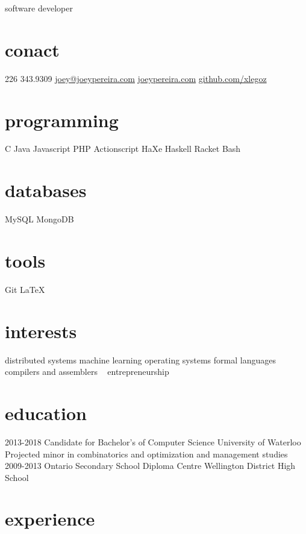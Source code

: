 \documentclass[]{friggeri-cv}
\begin{document}
       {software developer}

\begin{aside}
  \section{conact}
    226 343.9309
    \href{mailto:joey.pereira@uwaterloo.ca}{joey@joeypereira.com}
    \href{http://joeypereira.com}{joeypereira.com}
    \href{http://www.github.com/xlegoz}{github.com/xlegoz}
  \section{programming}
	C
	Java
	Javascript
	PHP
	Actionscript
	HaXe
	Haskell
	Racket
	Bash
  \section{databases}
    MySQL
    MongoDB
  \section{tools}
	Git
    \LaTeX
  \section{interests}
  	distributed systems
  	machine learning
  	operating systems
  	formal languages
  	compilers and assemblers
  	~
  	entrepreneurship   	
\end{aside}

\section{education}

\begin{entrylist}
  \entry
    {2013-2018}
    {Candidate for Bachelor's of Computer Science}
    {University of Waterloo}
	{Projected minor in combinatorics and optimization and management studies}
  \entry
  	{2009-2013}
  	{Ontario Secondary School Diploma}
  	{Centre Wellington District High School}
    {}
\end{entrylist}

\section{experience}
\end{document}
